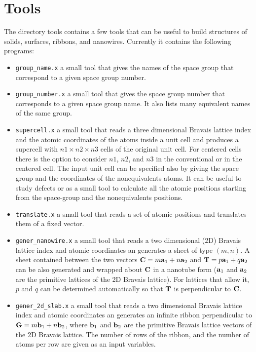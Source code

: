 \documentclass[12pt,a4paper]{article}
\begin{document}
\section{Tools}

The directory tools contains a few tools that can be useful to build
structures of solids, surfaces, ribbons, and nanowires. Currently it contains
the following programs:

\begin{itemize}

\item \texttt{group\_name.x} a small tool that gives the names of the 
space group that correspond to a given space group number. 

\item \texttt{group\_number.x} a small tool that gives the space group number
that corresponds to a given space group name. It also lists many equivalent
names of the same group.

\item \texttt{supercell.x} a small tool that reads a three dimensional
Bravais lattice index and the atomic coordinates of the atoms inside a unit
cell and produces a supercell with $n1 \times n2 \times n3$ cells of the original
unit cell. For centered cells there is the option to consider $n1$, $n2$,
and $n3$ in the conventional or in the centered cell.
The input unit cell can be specified also by giving the space group and
the coordinates of the nonequivalents atoms.
It can be useful to study defects or as a small tool to calculate all the 
atomic positions starting from the space-group and the 
nonequivalents positions.

\item \texttt{translate.x} a small tool that reads a set of atomic positions
and translates them of a fixed vector.

\item \texttt{gener\_nanowire.x} a small tool that reads a two dimensional (2D)
Bravais lattice index and atomic coordinates an generates a sheet of type
$(m,n)$. A sheet contained between the two vectors 
${\bf C} = m {\bf a}_1 + n {\bf a}_2$ and ${\bf T} = p {\bf a}_1 + q {\bf a}_2$
can be also generated and wrapped about ${\bf C}$ in a nanotube form 
(${\bf a}_1$ and ${\bf a}_2$ are the primitive lattices of the 2D Bravais 
lattice). 
For lattices that allow it, $p$ and $q$ can be determined automatically so that 
${\bf T}$ is perpendicular to ${\bf C}$.

\item \texttt{gener\_2d\_slab.x} a small tool that reads a two dimensional 
Bravais lattice index and atomic coordinates an generates an infinite ribbon
perpendicular to ${\bf G} = m {\bf b}_1 + n {\bf b}_2$, where 
${\bf b}_1$ and ${\bf b}_2$ are the primitive Bravais lattice vectors 
of the 2D Bravais lattice. The number of rows of the ribbon, and the number of
atoms per row are given as an input variables.


\end{itemize}
\end{document}
